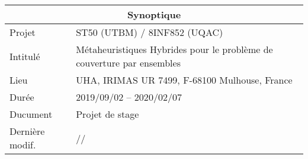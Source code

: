 
\begin{tabularx}{0.9\textwidth}{|l|X|}
	\hline
	\multicolumn{2}{|c|}{\cellcolor{gray!30}Synoptique}\\
	\hline
	Projet & \acrshort{ST50} (\acrshort{UTBM}) / \acrshort{8INF852} (\acrshort{UQAC})\\
	Intitulé & Métaheuristiques Hybrides pour le problème de couverture par ensembles\\
	Lieu & \acrshort{UHA}, \acrshort{IRIMAS} UR 7499, F-68100 Mulhouse, France\\
	Durée & 2019/09/02 -- 2020/02/07\\
	\hline
	Ducument & Projet de stage\\
	Dernière modif. & \the\year/\twodigits\month/\twodigits\day\\
	\hline
\end{tabularx}
